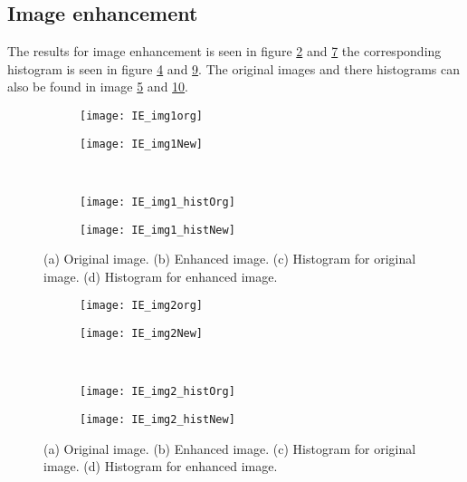 \subsection{Image enhancement}
The results for image enhancement is seen in figure \ref{fig:img1new} and \ref{fig:img2new} the corresponding histogram is seen in figure \ref{fig:img1histnew} and \ref{fig:img2histnew}. The original images and there histograms can also be found in image \ref{fig:img1} and \ref{fig:img2}.
\begin{figure}
	\centering
	\begin{subfigure}[b]{0.4\textwidth}
		\texttt{[image: IE\_img1org]}
		\caption{}
		\label{fig:img1org}
	\end{subfigure}
	\begin{subfigure}[b]{0.4\textwidth}
		\texttt{[image: IE\_img1New]}
		\caption{}
		\label{fig:img1new}
	\end{subfigure}
	\\
	\begin{subfigure}[b]{0.4\textwidth}
		\texttt{[image: IE\_img1\_histOrg]}
		\caption{}
		\label{fig:img1historg}
	\end{subfigure}
	\begin{subfigure}[b]{0.4\textwidth}
		\texttt{[image: IE\_img1\_histNew]}
		\caption{}
		\label{fig:img1histnew}
	\end{subfigure}
	\caption{(a) Original image. (b) Enhanced image. (c) Histogram for original image. (d) Histogram for enhanced image.}
	\label{fig:img1}
\end{figure}
\begin{figure}
	\centering
	\begin{subfigure}[b]{0.4\textwidth}
		\texttt{[image: IE\_img2org]}
		\caption{}
		\label{fig:img2org}
	\end{subfigure}
	\begin{subfigure}[b]{0.4\textwidth}
		\texttt{[image: IE\_img2New]}
		\caption{}
		\label{fig:img2new}
	\end{subfigure}
	\\
	\begin{subfigure}[b]{0.4\textwidth}
		\texttt{[image: IE\_img2\_histOrg]}
		\caption{}
		\label{fig:img2historg}
	\end{subfigure}
	\begin{subfigure}[b]{0.4\textwidth}
		\texttt{[image: IE\_img2\_histNew]}
		\caption{}
		\label{fig:img2histnew}
	\end{subfigure}
	\caption{(a) Original image. (b) Enhanced image. (c) Histogram for original image. (d) Histogram for enhanced image.}
	\label{fig:img2}
\end{figure}

